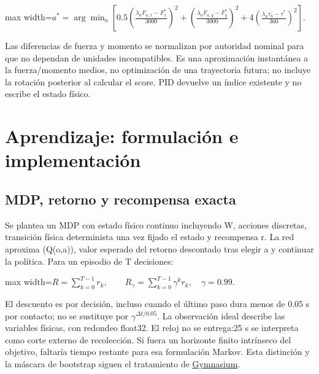 \documentclass[12pt,a4paper]{article}
\begin{document}
\begin{center}\begin{adjustbox}{max width=\linewidth}$\displaystyle a^*=\arg\min_a\left[
0.5\left(\frac{\lambda_a F_{a,x}-F_x^*}{3000}\right)^2+
\left(\frac{\lambda_a F_{a,y}-F_y^*}{3000}\right)^2+
4\left(\frac{\lambda_a\tau_a-\tau^*}{360}\right)^2\right].$\end{adjustbox}\end{center}



Las diferencias de fuerza y momento se normalizan por autoridad nominal para que no dependan de unidades incompatibles. Es una aproximación instantánea a la fuerza/\allowbreak{}momento medios,\allowbreak{} no optimización de una trayectoria futura; no incluye la rotación posterior al calcular el score. PID devuelve un índice existente y no escribe el estado físico.



\section{Aprendizaje: formulación e implementación}

\subsection{MDP,\allowbreak{} retorno y recompensa exacta}
Se plantea un MDP con estado físico continuo incluyendo W,\allowbreak{} acciones discretas,\allowbreak{} transición física determinista una vez fijado el estado y recompensa r. La red aproxima (Q(o,\allowbreak{}a)),\allowbreak{} valor esperado del retorno descontado tras elegir a y continuar la política. Para un episodio de T decisiones:



\begin{center}\begin{adjustbox}{max width=\linewidth}$\displaystyle R=\sum_{k=0}^{T-1}r_k,\qquad R_\gamma=\sum_{k=0}^{T-1}\gamma^k r_k,\quad \gamma=0.99.$\end{adjustbox}\end{center}



El descuento es por decisión,\allowbreak{} incluso cuando el último paso dura menos de 0.05 s por contacto; no se sustituye por $\gamma^{\Delta t/0.05}$. La observación ideal describe las variables físicas,\allowbreak{} con redondeo float32. El reloj no se entrega:25 s se interpreta como corte externo de recolección. Si fuera un horizonte finito intrínseco del objetivo,\allowbreak{} faltaría tiempo restante para esa formulación Markov. Esta distinción y la máscara de bootstrap siguen el tratamiento de \href{https://gymnasium.farama.org/tutorials/gymnasium_basics/handling_time_limits/}{Gymnasium}.
\end{document}
